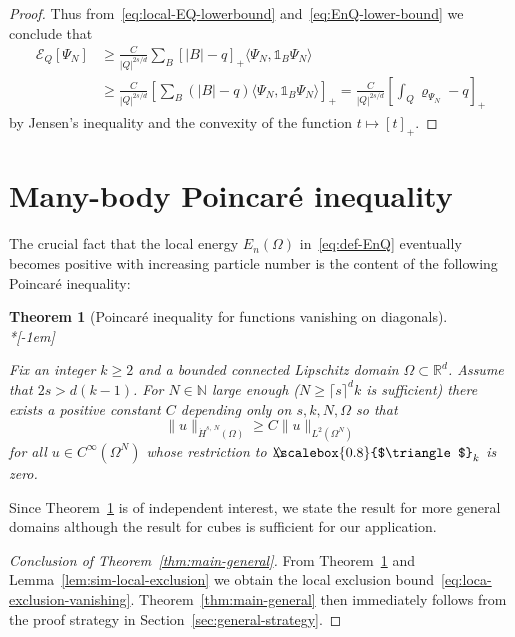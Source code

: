 \documentclass[10pt]{amsart}
\newtheorem{theo}{Theorem}[section]
\theoremstyle{definition}\newtheorem{defi}[theo]{Definition}\newtheorem{rema}[theo]{Remark}\newtheorem{exam}[theo]{Example}\newtheorem{exem}[theo]{Example}\newtheorem{nota}[theo]{Notation}
\newcommand*\N {\mathbb{N}}
\newcommand*\R {\mathbb{R}}
\newcommand\1{{\ensuremath {\mathds 1} }}
\newcommand{\cE}{\mathcal{E}}
\newcommand{\bDelta}{{\mbox{$\triangle$}\hspace{-8.6pt}\scalebox{0.8}{$\triangle$}}}
\begin{document}
\begin{proof}
Thus from~\eqref{eq:local-EQ-lowerbound} and~\eqref{eq:EnQ-lower-bound} we conclude that
\begin{align*}
\cE_Q[\Psi_N]&\ge
\frac{C}{|Q|^{2s/d}} \sum_{B} \left[|B|-q\right]_+ \langle \Psi_N, \1_B \Psi_N\rangle\\
&\ge
\frac{C}{|Q|^{2s/d}} \left[\sum_{B} (|B|-q) \langle \Psi_N, \1_B \Psi_N\rangle\right]_+
=
\frac{C}{|Q|^{2s/d}} \left[\int_{Q} \varrho_{\Psi_N} - q \right]_+
\end{align*}
by Jensen's inequality and the convexity of the function $t\mapsto [t]_+$.
\end{proof}


\section{Many-body Poincaré inequality} \label{sec:Poincare}

The crucial fact that the local energy $E_n(\Omega)$ in~\eqref{eq:def-EnQ} eventually becomes positive with increasing particle number is the content of the following Poincaré inequality:

\begin{theo}[Poincaré inequality for functions vanishing on diagonals]\label{thm:Poincare}\ \\*[-1em]

Fix an integer $k\geq 2$ and a bounded connected Lipschitz domain $\Omega\subset \R^d$. Assume that $2s>d(k-1)$. For $N \in \N$ large enough ($N \ge \lceil s \rceil^d k$ is sufficient) there exists a positive constant $C$ depending only on $s, k, N, \Omega$ so that
\begin{equation}\label{eq:Poincare_ineq_thm}
\|u\|_{\dot{H}^{s,\,N}(\Omega)}\geq C \|u\|_{L^2(\Omega^N)}
\end{equation}
for all $u\in C^\infty(\Omega^N)$ whose restriction to $\bDelta_k$ is zero.
\end{theo}

Since Theorem~\ref{thm:Poincare} is of independent interest, we state the result for more general domains although the result for cubes is sufficient for our application.

\begin{proof}[Conclusion of Theorem~\ref{thm:main-general}] From Theorem~\ref{thm:Poincare} and Lemma~\ref{lem:sim-local-exclusion} we obtain the local exclusion bound~\eqref{eq:loca-exclusion-vanishing}. Theorem~\ref{thm:main-general} then immediately follows from the proof strategy in Section~\ref{sec:general-strategy}.
\end{proof}
\end{document}
